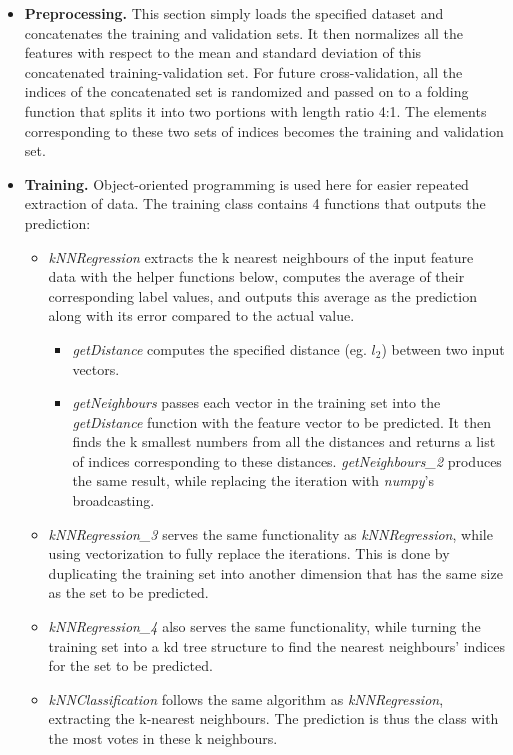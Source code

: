 \documentclass{article} %
\begin{document}
\begin{itemize}
  \item \textbf{Preprocessing.} This section  simply loads the specified dataset and concatenates the training and validation sets. It then normalizes all the features with respect to the mean and standard deviation of this concatenated training-validation set.
  For future cross-validation, all the indices of the concatenated set is randomized and passed on to a folding function that splits it into two portions with length ratio 4:1. The elements corresponding to these two sets of indices becomes the training and validation set.
  \item \textbf{Training.} Object-oriented programming is used here for easier repeated extraction of data. The training class contains 4 functions that outputs the prediction:
    \begin{itemize}
    \item \textit{kNNRegression} extracts the k nearest neighbours of the input feature data with the helper functions below, computes the average of their corresponding label values, and outputs this average as the prediction along with its error compared to the actual value.
      \begin{itemize}
      \item \textit{getDistance} computes the specified distance (eg. $l_2$) between two input vectors.
      \item \textit{getNeighbours} passes each vector in the training set into the \textit{getDistance} function with the feature vector to be predicted. It then finds the k smallest numbers from all the distances and returns a list of indices corresponding to these distances. \textit{getNeighbours\_2} produces the same result, while replacing the iteration with \textit{numpy}'s broadcasting.
    \end{itemize}
    \item \textit{kNNRegression\_3} serves the same functionality as  \textit{kNNRegression}, while using vectorization to fully replace the iterations. This is done by duplicating the training set into another dimension that has the same size as the set to be predicted.
    \item \textit{kNNRegression\_4} also serves the same functionality, while turning the training set into a kd tree structure to find the nearest neighbours' indices for the set to be predicted.
    \item \textit{kNNClassification} follows the same algorithm as \textit{kNNRegression}, extracting the k-nearest neighbours. The prediction is thus the class with the most votes in these k neighbours.

\end{itemize}
\end{itemize}
\end{document}
